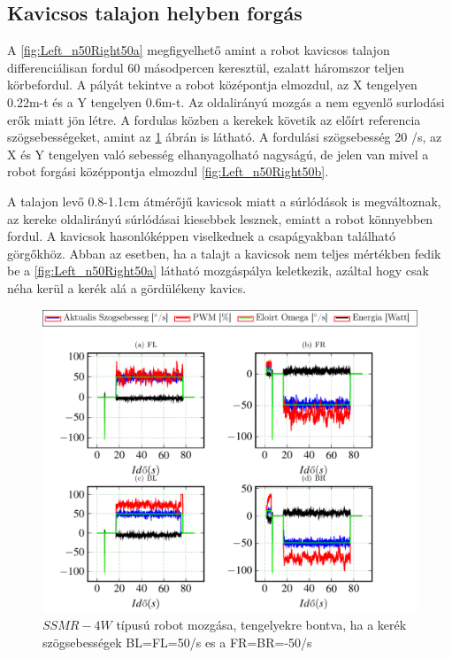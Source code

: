 \subsection{Kavicsos talajon helyben forgás}
A \ref{fig:Left_n50Right50a} megfigyelhető amint a robot kavicsos talajon differenciálisan fordul 60 másodpercen keresztül, ezalatt háromszor teljen körbefordul. A pályát tekintve a robot középontja elmozdul, az X tengelyen 0.22m-t és a Y tengelyen 0.6m-t.  Az oldalirányú mozgás a nem egyenlő surlodási erők miatt jön létre.
A fordulas közben a kerekek követik az előírt referencia szögsebességeket, amint az \ref{fig:Left_n50Right50x} ábrán is látható.
A fordulási szögsebesség 20 \degree/s, az X és Y tengelyen való sebesség elhanyagolható nagyságú, de jelen van mivel a robot forgási középpontja elmozdul \ref{fig:Left_n50Right50b}.

A talajon levő 0.8-1.1cm átmérőjű kavicsok miatt a súrlódások is megváltoznak, az kereke oldalirányú súrlódásai kiesebbek lesznek, emiatt a robot könnyebben fordul. A kavicsok hasonlóképpen viselkednek a csapágyakban található görgőkhöz.
Abban az esetben, ha a talajt a kavicsok nem teljes mértékben fedik be a \ref{fig:Left_n50Right50a} látható mozgáspálya keletkezik, azáltal hogy csak néha kerül a kerék alá a gördülékeny kavics.

\renewcommand{\nth}{2}
\renewcommand{\GlobalPath}{Meresek/Mozgasok/NormalMukodes/DiferencialisanHelybeKavicsos/}
\renewcommand{\secondImage}{*}



\begin{figure}[H]
  \includegraphics{tikz/Left_n50Right50x.pdf}
  \caption{$SSMR-4W$ típusú robot mozgása, tengelyekre bontva, ha a kerék szögsebességek BL=FL=50\degree/s es a FR=BR=-50\degree/s}
  \label{fig:Left_n50Right50x}
\end{figure}


